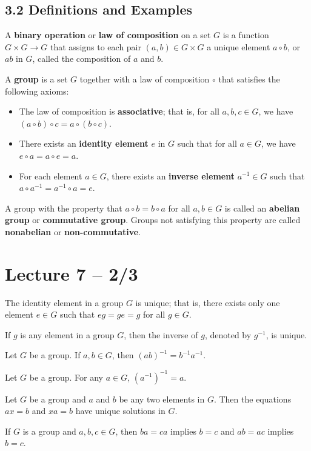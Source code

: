 \documentclass{article}
\begin{document}
\subsection{3.2 Definitions and Examples}
\begin{definition}
  A \textbf{binary operation} or \textbf{law of composition} on a set $G$ is a function $G\times G\to G$ that assigns to each pair $(a,b)\in G\times G$ a unique element $a \circ b$, or $ab$ in $G$, called the composition of $a$ and $b$.
\end{definition}
\begin{definition}
  A \textbf{group} is a set $G$ together with a law of composition $\circ$ that satisfies the following axioms:
  \begin{itemize}
    \item The law of composition is \textbf{associative}; that is, for all $a,b,c\in G$, we have $(a\circ b)\circ c=a\circ(b\circ c)$.
    \item There exists an \textbf{identity element} $e$ in $G$ such that for all $a\in G$, we have $e\circ a=a\circ e=a$.
    \item For each element $a\in G$, there exists an \textbf{inverse element} $a^{-1}\in G$ such that $a\circ a^{-1}=a^{-1}\circ a=e$.
  \end{itemize}
\end{definition}
A group with the property that $a\circ b=b\circ a$ for all $a,b\in G$ is called an \textbf{abelian group} or \textbf{commutative group}. Groups not satisfying this property are called \textbf{nonabelian} or \textbf{non-commutative}.

\section{Lecture 7 -- 2/3}

The identity element in a group $G$ is unique; that is, there exists only one element $e\in G$ such that $eg=ge=g$ for all $g\in G$.

If $g$ is any element in a group $G$, then the inverse of $g$, denoted by $g^{-1}$, is unique.

Let $G$ be a group. If $a,b\in G$, then $(ab)^{-1}=b^{-1}a^{-1}$.

Let $G$ be a group. For any $a\in G$, $(a^{-1})^{-1}=a$.

Let $G$ be a group and $a$ and $b$ be any two elements in $G$. Then the equations $ax=b$ and $xa=b$ have unique solutions in $G$.

If $G$ is a group and $a,b,c\in G$, then $ba=ca$ implies $b=c$ and $ab=ac$ implies $b=c$.
\end{document}
